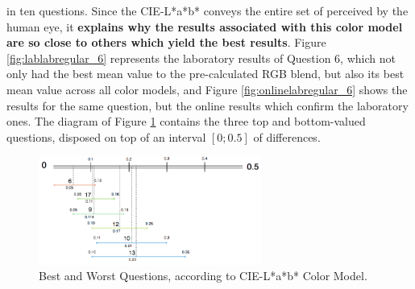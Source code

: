 in ten questions.
Since the CIE-L*a*b* conveys the entire set of perceived by the human eye, it \textbf{explains why the results associated with this color model are so close to others which yield the best results}.
Figure \ref{fig:lablabregular_6} represents the laboratory results of Question 6, which not only had the best mean value to the pre-calculated RGB blend, but also its best mean value across all color models,
and Figure \ref{fig:onlinelabregular_6} shows the results for the same question, but the online results which confirm the laboratory ones. The diagram of Figure \ref{fig:lab_analysis} contains the three top and bottom-valued questions, disposed on top of an interval $[0 ; 0.5]$ of differences. \par
%
\begin{figure}[!htbp]
  \centering
  \vspace{-15pt}
  \includegraphics[width=0.65\textwidth]{images/results/lab_questions_analysis.png}
  \caption[Best and Worst Questions, according to CIE-L*a*b* Color Model.]{Best and Worst Questions, according to CIE-L*a*b* Color Model.}
  \vspace{-5pt}
  \label{fig:lab_analysis}
\end{figure}
%
